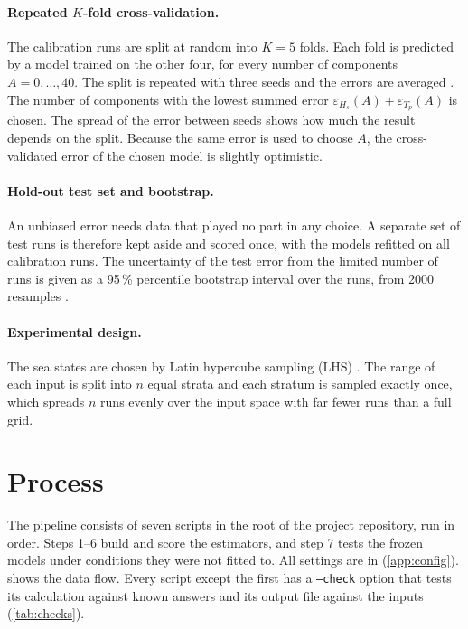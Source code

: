 \documentclass[11pt,a4paper]{article}
\newcommand{\Hs}{H_{s}}
\newcommand{\Tp}{T_{p}}
\begin{document}
\paragraph{Repeated $K$-fold cross-validation.}
The calibration runs are split at random into $K = 5$ folds. Each fold is predicted by a model
trained on the other four, for every number of components $A = 0, \dots, 40$. The split is
repeated with three seeds and the errors are averaged \citep{hastie2009}. The number of
components with the lowest summed error $\varepsilon_{\Hs}(A) + \varepsilon_{\Tp}(A)$ is chosen.
The spread of the error between seeds shows how much the result depends on the split. Because
the same error is used to choose $A$, the cross-validated error of the chosen model is slightly
optimistic.

\paragraph{Hold-out test set and bootstrap.}
An unbiased error needs data that played no part in any choice. A separate set of test runs is
therefore kept aside and scored once, with the models refitted on all calibration runs. The
uncertainty of the test error from the limited number of runs is given as a 95\,\% percentile
bootstrap interval over the runs, from 2000 resamples \citep{efron1993}.

\paragraph{Experimental design.}
The sea states are chosen by Latin hypercube sampling (LHS) \citep{mckay1979}. The range of
each input is split into $n$ equal strata and each stratum is sampled exactly once, which
spreads $n$ runs evenly over the input space with far fewer runs than a full grid.

\section{Process}
\label{sec:process}

The pipeline consists of seven scripts in the root of the project repository, run in order.
Steps 1--6 build and score the estimators, and step 7 tests the frozen models under conditions
they were not fitted to. All settings are in  (\cref{app:config}).  shows the data flow. Every script
except the first has a \texttt{--check} option that tests its calculation against known answers
and its output file against the inputs (\cref{tab:checks}).
\end{document}
